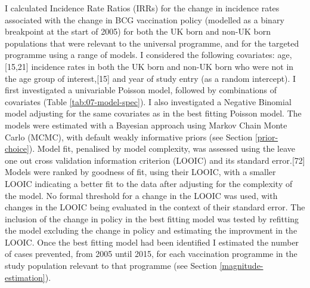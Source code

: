 \documentclass[11pt,twoside]{bristolthesis}
\begin{document}
  I calculated Incidence Rate Ratios (IRRs) for the change in incidence rates associated with the change in BCG vaccination policy (modelled as a binary breakpoint at the start of 2005) for both the UK born and non-UK born populations that were relevant to the universal programme, and for the targeted programme using a range of models. I considered the following covariates: age,{[}15,21{]} incidence rates in both the UK born and non-UK born who were not in the age group of interest,{[}15{]} and year of study entry (as a random intercept). I first investigated a univariable Poisson model, followed by combinations of covariates (Table \ref{tab:07-model-spec}). I also investigated a Negative Binomial model adjusting for the same covariates as in the best fitting Poisson model. The models were estimated with a Bayesian approach using Markov Chain Monte Carlo (MCMC), with default weakly informative priors (see Section \ref{prior-choice}). Model fit, penalised by model complexity, was assessed using the leave one out cross validation information criterion (LOOIC) and its standard error.{[}72{]} Models were ranked by goodness of fit, using their LOOIC, with a smaller LOOIC indicating a better fit to the data after adjusting for the complexity of the model. No formal threshold for a change in the LOOIC was used, with changes in the LOOIC being evaluated in the context of their standard error. The inclusion of the change in policy in the best fitting model was tested by refitting the model excluding the change in policy and estimating the improvment in the LOOIC. Once the best fitting model had been identified I estimated the number of cases prevented, from 2005 until 2015, for each vaccination programme in the study population relevant to that programme (see Section \ref{magnitude-estimation}).
\end{document}
